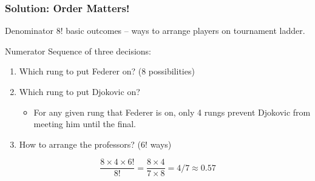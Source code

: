 \begin{frame}
  \frametitle{Solution: Order Matters!}
  \begin{block}{Denominator}
	$8!$ basic outcomes -- ways to arrange players on tournament ladder.
  \end{block}
  \begin{block}{Numerator}
   Sequence of three decisions:
   \begin{enumerate}
    \item Which rung to put Federer on? (8 possibilities)
    \item Which rung to put Djokovic on? 
      \begin{itemize}
        \item For any given rung that Federer is on, only 4 rungs prevent Djokovic from meeting him until the final.
      \end{itemize}
    \item How to arrange the professors? ($6!$ ways)
   \end{enumerate}
  \end{block}
\alert{$$\frac{8 \times 4 \times 6!}{8!} = \frac{8\times 4}{7\times 8} = 4/7 \approx 0.57$$}

\end{frame}
%
%
%
